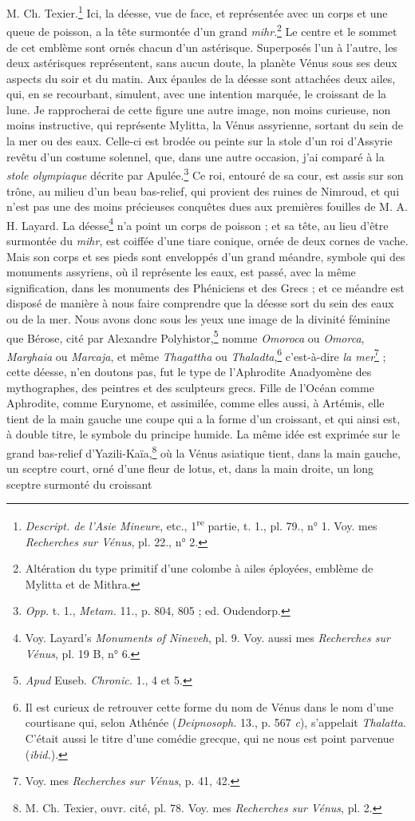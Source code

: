\documentclass{article}
\begin{document}
M. Ch. Texier.\footnote{\emph{Descript. de l'Asie Mineure}, etc., 1\textsuperscript{re} partie, t. 1., pl. 79., n° 1. Voy. mes \emph{Recherches sur Vénus}, pl. 22., n° 2.} Ici, la déesse, vue de face, et représentée avec un corps et une queue de poisson, a la tête surmontée d'un grand \emph{mihr}.\footnote{Altération du type primitif d'une colombe à ailes éployées, emblème de Mylitta et de Mithra.} Le centre et le sommet de cet emblème sont ornés chacun d'un astérisque. Superposés l'un à l'autre, les deux astérisques représentent, sans aucun doute, la planète Vénus sous ses deux aspects du soir et du matin. Aux épaules de la déesse sont attachées deux ailes, qui, en se recourbant, simulent, avec une intention marquée, le croissant de la lune. Je rapprocherai de cette figure une autre image, non moins curieuse, non moins instructive, qui représente Mylitta, la Vénus assyrienne, sortant du sein de la mer ou des eaux. Celle-ci est brodée ou peinte sur la stole d'un roi d'Assyrie revêtu d'un costume solennel, que, dans une autre occasion, j'ai comparé à la \emph{stole olympiaque} décrite par Apulée.\footnote{\emph{Opp.} t. 1., \emph{Metam.} 11., p. 804, 805 ; ed. Oudendorp.} Ce roi, entouré de sa cour, est assis sur son trône, au milieu d'un beau bas-relief, qui provient des ruines de Nimroud, et qui n'est pas une des moins précieuses conquêtes dues aux premières fouilles de M. A. H. Layard. La déesse\footnote{Voy. Layard's \emph{Monuments of Nineveh}, pl. 9. Voy. aussi mes \emph{Recherches sur Vénus}, pl. 19 B, n° 6.} n'a point un corps de poisson ; et sa tête, au lieu d'être surmontée du \emph{mihr}, est coiffée d'une tiare conique, ornée de deux cornes de vache. Mais son corps et ses pieds sont enveloppés d'un grand méandre, symbole qui des monuments assyriens, où il représente les eaux, est passé, avec la même signification, dans les monuments des Phéniciens et des Grecs ; et ce méandre est disposé de manière à nous faire comprendre que la déesse sort du sein des eaux ou de la mer. Nous avons donc sous les yeux une image de la divinité féminine que Bérose, cité par Alexandre Polyhistor,\footnote{\emph{Apud} Euseb. \emph{Chronic.} 1., 4 et 5.} nomme \emph{Omoroca} ou \emph{Omorca}, \emph{Marghaia} ou \emph{Marcaja}, et même \emph{Thagattha} ou \emph{Thaladta},\footnote{Il est curieux de retrouver cette forme du nom de Vénus dans le nom d'une courtisane qui, selon Athénée (\emph{Deipnosoph.} 13., p. 567 \emph{c}), s'appelait \emph{Thalatta}. C'était aussi le titre d'une comédie grecque, qui ne nous est point parvenue (\emph{ibid.}).} c'est-à-dire \emph{la mer}\footnote{Voy. mes \emph{Recherches sur Vénus}, p. 41, 42.} ; cette déesse, n'en doutons pas, fut le type de l'Aphrodite Anadyomène des mythographes, des peintres et des sculpteurs grecs. Fille de l'Océan comme Aphrodite, comme Eurynome, et assimilée, comme elles aussi, à Artémis, elle tient de la main gauche une coupe qui a la forme d'un croissant, et qui ainsi est, à double titre, le symbole du principe humide. La même idée est exprimée sur le grand bas-relief d'Yazili-Kaïa,\footnote{M. Ch. Texier, ouvr. cité, pl. 78. Voy. mes \emph{Recherches sur Vénus}, pl. 2.} où la Vénus asiatique tient, dans la main gauche, un sceptre court, orné d'une fleur de lotus, et, dans la main droite, un long sceptre surmonté du croissant 
\end{document}

